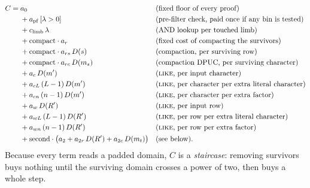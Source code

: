 \begin{align*}
  C = {}& a_0
    && \text{(fixed floor of every proof)} \\
  &+ a_{\mathrm{pf}}\, [\lambda > 0]
    && \text{(pre-filter check, paid once if any bin is tested)} \\
  &+ c_{\mathrm{limb}}\, \lambda
    && \text{(AND lookup per touched limb)} \\
  &+ \mathrm{compact} \cdot a_r
    && \text{(fixed cost of compacting the survivors)} \\
  &+ \mathrm{compact} \cdot a_{rs}\, D(s)
    && \text{(compaction, per surviving row)} \\
  &+ \mathrm{compact} \cdot a_{rc}\, D(m_s)
    && \text{(compaction DPUC, per surviving character)} \\
  &+ a_c\, D(m')
    && \text{(\textsc{like}, per input character)} \\
  &+ a_{cL}\, (L - 1)\, D(m')
    && \text{(\textsc{like}, per character per extra literal character)} \\
  &+ a_{cn}\, (n - 1)\, D(m')
    && \text{(\textsc{like}, per character per extra factor)} \\
  &+ a_w\, D(R')
    && \text{(\textsc{like}, per input row)} \\
  &+ a_{wL}\, (L - 1)\, D(R')
    && \text{(\textsc{like}, per row per extra literal character)} \\
  &+ a_{wn}\, (n - 1)\, D(R')
    && \text{(\textsc{like}, per row per extra factor)} \\
  &+ \mathrm{second} \cdot \bigl(a_2 + a_{2r}\, D(R') + a_{2c}\, D(m_t)\bigr)
    && \text{(see below).}
\end{align*}
Because every term reads a padded domain, $C$ is a \emph{staircase}:
removing survivors buys nothing until the surviving domain crosses a
power of two, then buys a whole step.

